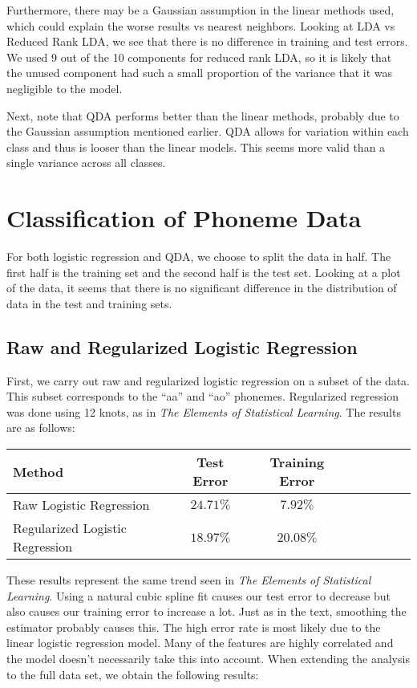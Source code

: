 \documentclass[a4paper,10pt]{article}
\begin{document}
Furthermore, there may be a Gaussian assumption in the linear methods used, 
which could explain the worse results vs nearest neighbors. Looking at
LDA vs Reduced Rank LDA, we see that there is no difference in training and
test errors. We used 9 out of the 10 components for reduced rank LDA, so 
it is likely that the unused component had such a small proportion of the 
variance that it was negligible to the model.

Next, note that QDA performs better than the linear methods, probably due to
the Gaussian assumption mentioned earlier. QDA allows for variation within
each class and thus is looser than the linear models. This seems more
valid than a single variance across all classes.

\section{Classification of Phoneme Data}

For both logistic regression and QDA, we choose to split the data in half.
The first half is the training set and the second half is the test set. 
Looking at a plot of the data, it seems that there is no significant 
difference in the distribution of data in the test and training sets. 

\subsection{Raw and Regularized Logistic Regression}

First, we carry out raw and regularized logistic regression on a subset of
the data. This subset corresponds to the ``aa'' and ``ao'' phonemes. 
Regularized regression was done using 12 knots, as in \textit{The Elements
of Statistical Learning}. The results are as follows:

\begin{tabular}{l*{6}{c}r}
  \hline
 Method		& Test Error & Training Error \\
 \hline
 Raw Logistic Regression		& $24.71\%$ & $7.92\%$ \\
 Regularized Logistic Regression 	& $18.97\%$ & $20.08\%$ \\
 \hline
\end{tabular}

These results represent the same trend seen in \textit{The Elements of
Statistical Learning}. Using a natural cubic spline fit causes our test error
to decrease but also causes our training error to increase a lot. Just as
in the text, smoothing the estimator probably causes this. The high error 
rate is most likely due to the linear logistic regression model. Many of 
the features are highly correlated and the model doesn't necessarily take
this into account. When extending the analysis to the full data set, we
obtain the following results:
\end{document}
